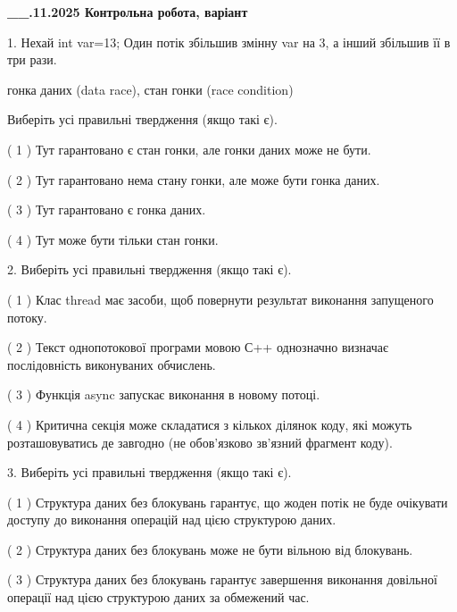 \documentclass[12pt, ukrainian]{article}
\begin{document}
\newpage
\begin {large}

\textbf{\_\_.11.2025 Контрольна робота, варіант  }\par


{
1. Нехай int var=13; Один потік збільшив змінну var на 3, а інший збільшив її в три рази.

гонка даних (data race), стан гонки (race condition)

Виберіть усі правильні твердження (якщо такі є).\par
\vspace{2mm}
( 1 ) Тут гарантовано є стан гонки, але гонки даних може не бути.%

( 2 ) Тут гарантовано нема стану гонки, але може бути гонка даних.%

( 3 ) Тут гарантовано є гонка даних.%

( 4 ) Тут може бути тільки стан гонки.%


2. Виберіть усі правильні твердження (якщо такі є).\par
\vspace{2mm}

( 1 ) Клас thread має засоби, щоб повернути результат виконання запущеного потоку.%

( 2 ) Текст однопотокової програми мовою С++ однозначно визначає послідовність виконуваних обчислень.%

( 3 ) Функція async запускає виконання в новому потоці.%

( 4 ) Критична секція може складатися з кількох ділянок коду, які можуть розташовуватись де завгодно (не обов’язково зв’язний фрагмент коду).%


3. Виберіть усі правильні твердження (якщо такі є).\par
\vspace{2mm}

( 1 ) Структура даних без блокувань гарантує, що жоден потік не буде очікувати доступу до виконання операцій над цією структурою даних.%

( 2 ) Структура даних без блокувань може не бути вільною від блокувань.%

( 3 ) Структура даних без блокувань гарантує завершення виконання довільної операції над цією структурою даних за обмежений час.%

}
\end{large}
\end{document}
